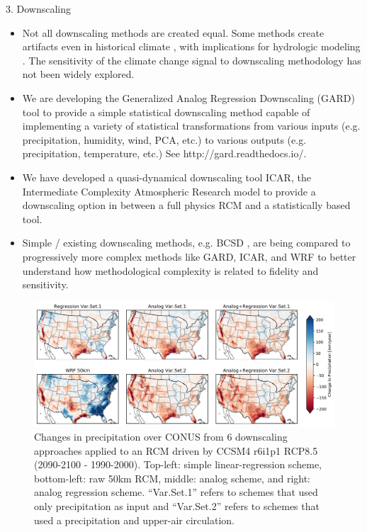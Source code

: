 \documentclass{beamer}
\begin{document}
\begin{frame}{}
\begin{columns}
\begin{column}{.3333\paperwidth}
\begin{textblock}{\textwidth \TPHorizModule}
\begin{block}{3. Downscaling}
\begin{itemize}
      \item Not all downscaling methods are created equal. Some methods create artifacts even in historical climate \citep{Gutmann_2014}, with implications for hydrologic modeling \citep{Mizukami_2016}. The sensitivity of the climate change signal to downscaling methodology has not been widely explored.
      \item We are developing the Generalized Analog Regression Downscaling (GARD) tool to provide a simple statistical downscaling method capable of implementing a variety of statistical transformations from various inputs (e.g. precipitation, humidity, wind, PCA, etc.) to various outputs (e.g. precipitation, temperature, etc.) See http://gard.readthedocs.io/.
      \item We have developed a quasi-dynamical downscaling tool ICAR, the Intermediate Complexity Atmospheric Research model \citep{Gutmann_2016} to provide a downscaling option in between a full physics RCM and a statistically based tool.
      \item Simple / existing downscaling methods, e.g. BCSD \citep{Wood_2004}, are being compared to progressively more complex methods like GARD, ICAR, and WRF to better understand how methodological complexity is related to fidelity and sensitivity.

     \end{itemize}

     \vspace{-0.5cm}
     \begin{figure}
      \center\includegraphics[width=0.8\linewidth]{figures/precip_change.png}
      \caption{Changes in precipitation over CONUS from 6 downscaling approaches applied to an RCM driven by CCSM4 r6i1p1 RCP8.5 (2090-2100 - 1990-2000). Top-left: simple linear-regression scheme, bottom-left: raw 50km RCM, middle: analog scheme, and right: analog regression scheme. ``Var.Set.1'' refers to schemes that used only precipitation as input and ``Var.Set.2'' refers to schemes that used a precipitation and upper-air circulation.}
      \label{fig:downscaling}
     \end{figure}


\end{block}
\end{textblock}
\end{column}
\end{columns}
\end{frame}
\end{document}

